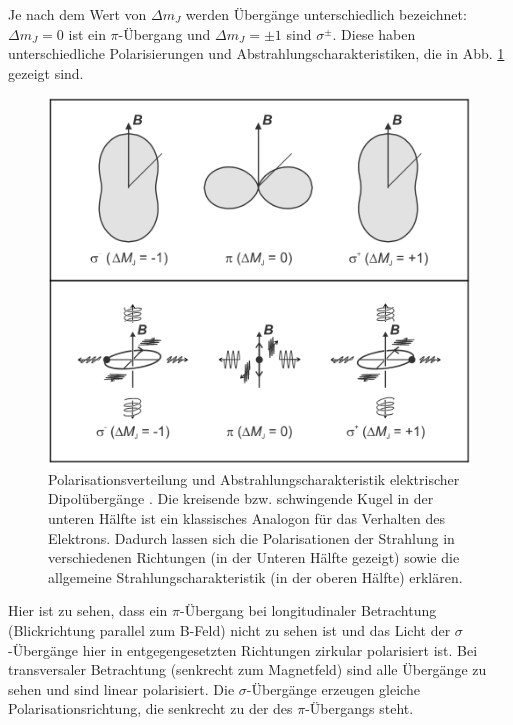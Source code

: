 \documentclass{article}
\begin{document}
\begin{multicols}{2}
Je nach dem Wert von $\Delta m_J$ werden Übergänge unterschiedlich bezeichnet:
$\Delta m_J=0$ ist ein $\pi$-Übergang und $\Delta m_J=\pm 1$ sind $\sigma^\pm$.
Diese haben unterschiedliche Polarisierungen und Abstrahlungscharakteristiken, die in Abb. \ref{fig:zeeman-abstrahlung}
gezeigt sind.
\begin{figure}[H]
  \centering
  \includegraphics[width=.8\linewidth]{zeeman-abstrahlung}
  \caption{Polarisationsverteilung und Abstrahlungscharakteristik elektrischer Dipolübergänge \cite{Anleitung} \cite{Leybold}.
    Die kreisende bzw. schwingende Kugel in der unteren Hälfte ist ein klassisches Analogon für das Verhalten des Elektrons.
    Dadurch lassen sich die Polarisationen der Strahlung in verschiedenen Richtungen (in der Unteren Hälfte gezeigt)
    sowie die allgemeine Strahlungscharakteristik (in der oberen Hälfte) erklären.}
  \label{fig:zeeman-abstrahlung}
\end{figure}
Hier ist zu sehen, dass ein $\pi$-Übergang bei longitudinaler Betrachtung (Blickrichtung parallel zum B-Feld) nicht zu sehen ist
und das Licht der $\sigma$-Übergänge hier in entgegengesetzten Richtungen zirkular polarisiert ist.
Bei transversaler Betrachtung (senkrecht zum Magnetfeld) sind alle Übergänge zu sehen und sind linear polarisiert.
Die $\sigma$-Übergänge erzeugen gleiche Polarisationsrichtung, die senkrecht zu der des $\pi$-Übergangs steht.


\end{multicols}
\end{document}
